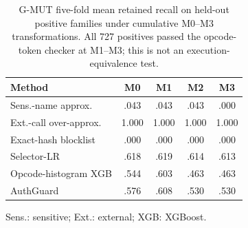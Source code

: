 \begin{table}[t]
  \centering
  \caption{G-MUT five-fold mean retained recall on held-out positive families under cumulative M0--M3 transformations. All 727 positives passed the opcode-token checker at M1--M3; this is not an execution-equivalence test.}
  \label{tab:gmut-robustness}
  \scriptsize
  \setlength{\tabcolsep}{3.2pt}
  \begin{tabular}{@{}lcccc@{}}
    \toprule
    Method & M0 & M1 & M2 & M3 \\
    \midrule
    Sens.-name approx. & .043 & .043 & .043 & .000 \\
    Ext.-call over-approx. & 1.000 & 1.000 & 1.000 & 1.000 \\
    Exact-hash blocklist & .000 & .000 & .000 & .000 \\
    Selector-LR & .618 & .619 & .614 & .613 \\
    Opcode-histogram XGB & .544 & .603 & .463 & .463 \\
    AuthGuard & .576 & .608 & .530 & .530 \\
    \bottomrule
  \end{tabular}
  \vspace{1pt}

  \parbox{\columnwidth}{\scriptsize Sens.: sensitive; Ext.: external; XGB: XGBoost.}
\end{table}
